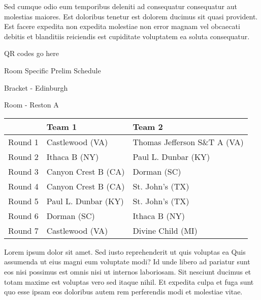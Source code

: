 \documentclass{article}%
\begin{document}
\newline%
Sed cumque odio eum temporibus deleniti ad consequatur consequatur aut molestias maiores. Est doloribus tenetur est dolorem ducimus sit quasi provident. Est facere expedita non expedita molestiae non error magnam vel obcaecati debitis et blanditiis reiciendis est cupiditate voluptatem ea soluta consequatur.%
\vspace*{140pt}%
\begin{center}%
\begin{Huge}%
QR codes go here%
\end{Huge}%
\end{center}%
\newpage%
\begin{center}%
\begin{Huge}%
Room Specific Prelim Schedule%
\end{Huge}%
\vspace*{8pt}%
\linebreak%
\begin{Large}%
Bracket {-} Edinburgh%
\end{Large}%
\vspace*{8pt}%
\linebreak%
\vspace*{8pt}%
\begin{Large}%
Room {-} Reston A%
\end{Large}%
\end{center}%
%
\begin{tabularx}{\textwidth}{|c|Y|Y|}%
\hline%
&Team 1&Team 2\\%
\hline%
Round 1&Castlewood (VA)&Thomas Jefferson S\&T A (VA)\\%
Round 2&Ithaca B (NY)&Paul L. Dunbar (KY)\\%
Round 3&Canyon Crest B (CA)&Dorman (SC)\\%
Round 4&Canyon Crest B (CA)&St. John's (TX)\\%
Round 5&Paul L. Dunbar (KY)&St. John's (TX)\\%
Round 6&Dorman (SC)&Ithaca B (NY)\\%
Round 7&Castlewood (VA)&Divine Child (MI)\\%
\hline%
\end{tabularx}%
\vspace*{8pt}%
\newline%
Lorem ipsum dolor sit amet. Sed iusto reprehenderit ut quis voluptas ea Quis assumenda ut eius magni eum voluptate modi? Id unde libero ad pariatur sunt eos nisi possimus est omnis nisi ut internos laboriosam. Sit nesciunt ducimus et totam maxime est voluptas vero sed itaque nihil. Et expedita culpa et fuga sunt quo esse ipsam eos doloribus autem rem perferendis modi et molestiae vitae.\newline%
\end{document}
